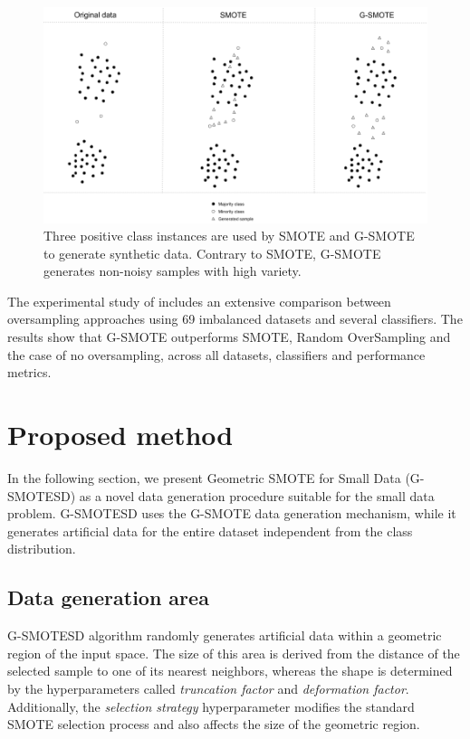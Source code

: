 \documentclass[parskip=full]{scrartcl}
\begin{document}
\begin{figure}[H]
	\centering
	\includegraphics[width=1\linewidth]{../analysis/smote_vs_gsmote}
	\caption{Three positive class instances are used by SMOTE and G-SMOTE 
	to generate synthetic data. Contrary to SMOTE, G-SMOTE generates non-noisy samples with high variety.}
	\label{fig:smotevsgsmote}
\end{figure}

The experimental study of \cite{Douzas.2019} includes an extensive comparison between oversampling approaches using 69 imbalanced datasets and several classifiers. The results show that G-SMOTE outperforms SMOTE, Random OverSampling and the case of no oversampling, across all datasets, classifiers and performance metrics.

\section{Proposed method}
\label{proposed}

In the following section, we present Geometric SMOTE for Small Data (G-SMOTESD) as a novel data generation procedure suitable for the small data problem. G-SMOTESD uses the G-SMOTE data generation mechanism, while it generates artificial data for the entire dataset independent from the class distribution. 

\subsection{Data generation area}

G-SMOTESD algorithm randomly generates artificial data within a geometric region of the input space. The size of this area is derived from the distance of the selected sample to one of its nearest neighbors, whereas the shape is determined by the hyperparameters called \textit{truncation factor} and \textit{deformation factor}. Additionally, the \textit{selection strategy} hyperparameter modifies the standard SMOTE selection process and also affects the size of the geometric region.
\end{document}
